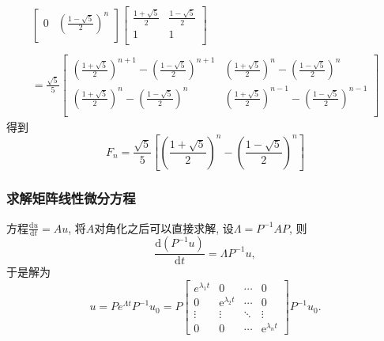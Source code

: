 \begin{example}
\begin{equation}
\begin{aligned}
\begin{bmatrix}
               0 & \left( \frac{1-\sqrt{5}}{2} \right) ^{n}\\
              \end{bmatrix}
              \begin{bmatrix}
               \frac{1+\sqrt{5}}{2} & \frac{1-\sqrt{5}}{2}\\
               1 & 1\\
              \end{bmatrix}
              \\ \\
              =
              \frac{\sqrt{5}}{5}
              \begin{bmatrix}
               \left( \frac{1+\sqrt{5}}{2} \right) ^{n+1} - \left( \frac{1-\sqrt{5}}{2} \right) ^{n+1} &\left( \frac{1+\sqrt{5}}{2} \right) ^{n} - \left( \frac{1-\sqrt{5}}{2} \right) ^{n} \\
               \left( \frac{1+\sqrt{5}}{2} \right) ^{n} - \left( \frac{1-\sqrt{5}}{2} \right) ^{n} & \left( \frac{1+\sqrt{5}}{2} \right) ^{n-1} - \left( \frac{1-\sqrt{5}}{2} \right) ^{n-1}\\
              \end{bmatrix}
          \end{aligned}
    \end{equation}
    得到
    \begin{equation}
      F_n = \frac{\sqrt{5}}{5} \left[ \left( \frac{1+\sqrt{5}}{2} \right) ^{n} - \left( \frac{1-\sqrt{5}}{2} \right)^{n}  \right] 
    \end{equation}
\end{example}

\subsubsection{求解矩阵线性微分方程}
方程$\frac{\mathrm{d}u}{\mathrm{d} t} = Au$, 将$A$对角化之后可以直接求解, 设$\Lambda = P ^{-1} A P$, 则
\begin{equation}
  \frac{\mathrm{d}(P^{-1}u)}{\mathrm{d} t} = \Lambda P^{-1} u,
\end{equation}
于是解为
\begin{equation}
    u = P e^{\Lambda t} P ^{-1} u_0 = P \begin{bmatrix}
        e^{\lambda_1 t}&0&\cdots&0\\
        0&\mathrm{e}^{\lambda_2 t}&\cdots&0\\
        \vdots&\vdots&\ddots&\vdots\\
        0&0&\cdots&\mathrm{e}^{\lambda_n t}
    \end{bmatrix} P ^{-1} u_0.
\end{equation}

